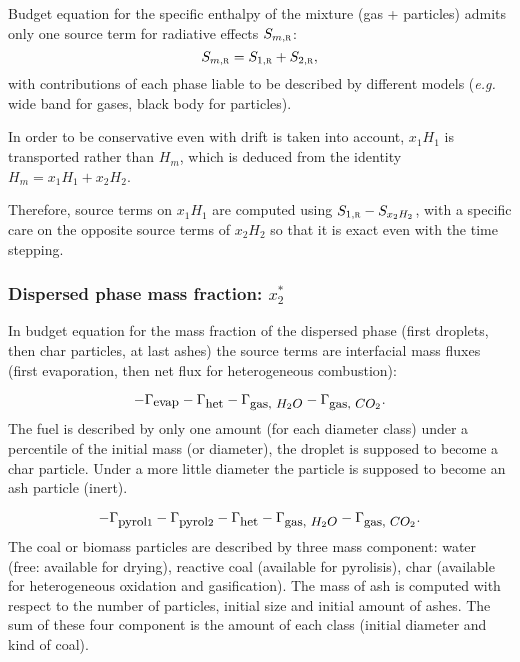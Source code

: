 Budget equation for the specific enthalpy of the mixture (gas + particles)
admits only one source term for radiative effects
$S_{m,\mbox{\scriptsize\textsc{r}}}$:
\begin{equation}
    S_{m,\mbox{\scriptsize\textsc{r}}}= S_{1,\mbox{\scriptsize\textsc{r}}}+ S_{2,\mbox{\scriptsize\textsc{r}}},
\end{equation}
with contributions of each phase liable to be described by different models (\emph{e.g.} wide band for gases, black body for particles).

In order to be conservative even with drift is taken into account, $x_1 H_1$ is transported
rather than $H_m$, which is deduced from the identity $H_m = x_1 H_1 + x_2 H_2$.

Therefore, source terms on $x_1 H_1$ are computed using $ S_{1,\mbox{\scriptsize\textsc{r}}} - S_{x_2 H_2}$,
with a specific care on the opposite source terms of $x_2 H_2$ so that it is exact even with the time stepping.

\subsubsection{Dispersed phase mass fraction: $x_{2}^{*}$}

In budget equation for the mass fraction of the dispersed phase (first droplets,
then char particles, at last ashes) the source terms are interfacial mass fluxes
(first evaporation, then net flux for heterogeneous combustion):

\begin{equation}
     -\Gamma_{\mbox{\small evap}}-\Gamma_{\mbox{\small het}}-\Gamma_{\mbox{\small gas, $H_{2}O$}}-\Gamma_{\mbox{\small gas, $CO_2$}}.
\end{equation}
The fuel is described by only one amount (for each diameter class) under a
percentile of the initial mass (or diameter), the droplet is supposed to become
a char particle. Under a more little diameter the particle is supposed to become
an ash particle (inert).

\begin{equation}
     -\Gamma_{\mbox{\small pyrol}1}-\Gamma_{\mbox{\small pyrol}2}-\Gamma_{\mbox{\small het}}-\Gamma_{\mbox{\small gas, $H_{2}O$}}-\Gamma_{\mbox{\small gas, $CO_2$}}.
\end{equation}
The coal or biomass particles are described by three mass component: water
(free: available for drying), reactive coal (available for pyrolisis), char
(available for heterogeneous oxidation and gasification). The mass of ash is
computed with respect to the number of particles, initial size and initial
amount of ashes. The sum of these four component is the amount of each class
(initial diameter and kind of coal).

